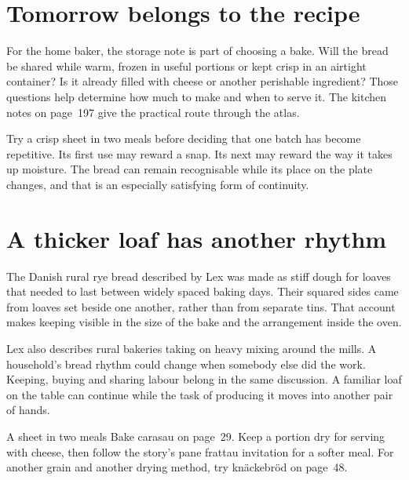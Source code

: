 \section{Tomorrow belongs to the recipe}
For the home baker, the storage note is part of choosing a bake. Will the bread be shared while warm, frozen in useful portions or kept crisp in an airtight container? Is it already filled with cheese or another perishable ingredient? Those questions help determine how much to make and when to serve it. The kitchen notes on page~197 give the practical route through the atlas.

Try a crisp sheet in two meals before deciding that one batch has become repetitive. Its first use may reward a snap. Its next may reward the way it takes up moisture. The bread can remain recognisable while its place on the plate changes, and that is an especially satisfying form of continuity.

\section{A thicker loaf has another rhythm}
The Danish rural rye bread described by Lex was made as stiff dough for loaves that needed to last between widely spaced baking days. Their squared sides came from loaves set beside one another, rather than from separate tins. That account makes keeping visible in the size of the bake and the arrangement inside the oven.\citep{lexrye}

Lex also describes rural bakeries taking on heavy mixing around the mills. A household's bread rhythm could change when somebody else did the work. Keeping, buying and sharing labour belong in the same discussion. A familiar loaf on the table can continue while the task of producing it moves into another pair of hands.

\begin{breadnote}{A sheet in two meals}
Bake carasau on page~29. Keep a portion dry for serving with cheese, then follow the story's pane frattau invitation for a softer meal. For another grain and another drying method, try knäckebröd on page~48.
\end{breadnote}
